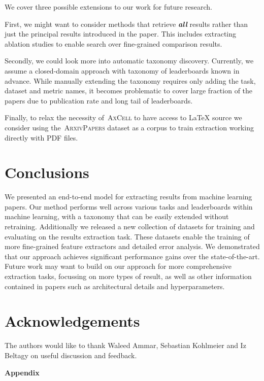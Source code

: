 \documentclass[11pt,a4paper]{article}
\newcommand{\model}{\textsc{AxCell}}
\newcommand{\unlabeled}{\textsc{ArxivPapers}}
\begin{document}
We cover three possible extensions to our work for future research. 

First, we might want to consider methods that retrieve \textit{\textbf{all}} results rather than just the principal results introduced in the paper. This includes extracting ablation studies to enable search over fine-grained comparison results. 

Secondly, we could look more into automatic taxonomy discovery. Currently, we assume a closed-domain approach with taxonomy of leaderboards known in advance. While manually extending the taxonomy requires only adding the task, dataset and metric names, it becomes problematic to cover large fraction of the papers due to publication rate and long tail of leaderboards. 

Finally, to relax the necessity of~\model{} to have access to \LaTeX{} source we consider using the~\unlabeled{} dataset as a corpus to train extraction working directly with PDF files.

\section{Conclusions}
We presented an end-to-end model for extracting results from machine learning papers. Our method performs well across various tasks and leaderboards within machine learning, with a taxonomy that can be easily extended without retraining. Additionally we released a new collection of datasets for training and evaluating on the results extraction task. These datasets enable the training of more fine-grained feature extractors and detailed error analysis. We demonstrated that our approach achieves significant performance gains over the state-of-the-art. Future work may want to build on our approach for more comprehensive extraction tasks, focussing on more types of result, as well as other information contained in papers such as architectural details and hyperparameters. \section*{Acknowledgements}

The authors would like to thank Waleed Ammar, Sebastian Kohlmeier and Iz Beltagy on useful discussion and feedback.  



\newpage
\clearpage
\appendix
{\noindent\Large\textbf{Appendix}}
\end{document}
